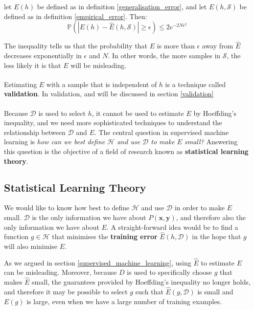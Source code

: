 \begin{theorem}
	let $E(h)$ be defined as in definition \ref{generalisation_error}, and let $E(h, \mathcal{S})$ be defined as in definition \ref{empirical_error}. Then:
	$$
	\mathbb{P}\left( |E(h) - \hat{E}(h, \mathcal{S})| \geq \epsilon \right) \leq 2e^{-2N\epsilon^2}
	$$
\end{theorem}

The inequality tells us that the probability that $E$ is more than $\epsilon$ away from $\hat{E}$ decreases exponentially in $\epsilon$ and $N$. In other words, the more samples in $\mathcal{S}$, the less likely it is that $E$ will be misleading.
\\\\
Estimating $E$ with a sample that is independent of $h$ is a technique called \textbf{validation}. In validation, and will be discussed in section \ref{validation}
\\\\
Because $\mathcal{D}$ is used to select $h$, it cannot be used to estimate $E$ by Hoeffding's inequality, and we need more sophisticated techniques to understand the relationship between $\mathcal{D}$ and $E$. The central question in supervised machine learning is \textit{how can we best define $\mathcal{H}$ and use $\mathcal{D}$ to make $E$ small?} Answering this question is the objective of a field of research known as \textbf{statistical learning theory}.

\subsection{Statistical Learning Theory}
\label{statistical_learning_theory}
We would like to know how best to define $\mathcal{H}$ and use $\mathcal{D}$ in order to make $E$ small. $\mathcal{D}$ is the only information we have about $P(\mathbf{x}, \mathbf{y})$, and therefore also the only information we have about $E$. A straight-forward idea would be to find a function $g \in \mathcal{H}$ that minimises the \textbf{training error} $\hat{E}(h, \mathcal{D})$ in the hope that $g$ will also minimise $E$. 

As we argued in section \ref{supervised_machine_learning}, using $\hat{E}$ to estimate $E$ can be misleading. Moreover, because $D$ is used to specifically choose $g$ that makes $\hat{E}$ small, the guarantees provided by Hoeffding's inequality no longer holds, and therefore it may be possible to select $g$ such that $\hat{E}(g, \mathcal{D})$ is small and $E(g)$ is large, even when we have a large number of training examples.

